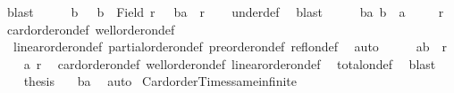 \begin{isabellebody}
\ blast\isanewline
\ \ \isamarkupfalse%
\ \isamarkupfalse%
\ b\ \ {}{\isacharcolon}{\kern0pt}\ {\isachardoublequoteopen}b\ {\isasymin}\ Field\ r\ {\isasymand}\ {\isasymnot}\ {\isacharparenleft}{\kern0pt}b{\isacharcomma}{\kern0pt}a{\isacharparenright}{\kern0pt}\ {\isasymin}\ r{\isachardoublequoteclose}\isanewline
\ \ \isamarkupfalse%
\ under{\isacharunderscore}{\kern0pt}def\ \isamarkupfalse%
\ blast\isanewline
\ \ \isamarkupfalse%
\ \isamarkupfalse%
\ ba{\isacharcolon}{\kern0pt}\ {\isachardoublequoteopen}b\ {\isasymnoteq}\ a{\isachardoublequoteclose}\isanewline
\ \ \isamarkupfalse%
\ {}\ r\ \isamarkupfalse%
\ card{\isacharunderscore}{\kern0pt}order{\isacharunderscore}{\kern0pt}on{\isacharunderscore}{\kern0pt}def\ well{\isacharunderscore}{\kern0pt}order{\isacharunderscore}{\kern0pt}on{\isacharunderscore}{\kern0pt}def\isanewline
\ \ linear{\isacharunderscore}{\kern0pt}order{\isacharunderscore}{\kern0pt}on{\isacharunderscore}{\kern0pt}def\ partial{\isacharunderscore}{\kern0pt}order{\isacharunderscore}{\kern0pt}on{\isacharunderscore}{\kern0pt}def\ preorder{\isacharunderscore}{\kern0pt}on{\isacharunderscore}{\kern0pt}def\ refl{\isacharunderscore}{\kern0pt}on{\isacharunderscore}{\kern0pt}def\ \isamarkupfalse%
\ auto\isanewline
\ \ \isamarkupfalse%
\ \isamarkupfalse%
\ {\isachardoublequoteopen}{\isacharparenleft}{\kern0pt}a{\isacharcomma}{\kern0pt}b{\isacharparenright}{\kern0pt}\ {\isasymin}\ r{\isachardoublequoteclose}\isanewline
\ \ \isamarkupfalse%
\ a\ r\ \isamarkupfalse%
\ card{\isacharunderscore}{\kern0pt}order{\isacharunderscore}{\kern0pt}on{\isacharunderscore}{\kern0pt}def\ well{\isacharunderscore}{\kern0pt}order{\isacharunderscore}{\kern0pt}on{\isacharunderscore}{\kern0pt}def\ linear{\isacharunderscore}{\kern0pt}order{\isacharunderscore}{\kern0pt}on{\isacharunderscore}{\kern0pt}def\isanewline
\ \ total{\isacharunderscore}{\kern0pt}on{\isacharunderscore}{\kern0pt}def\ \isamarkupfalse%
\ blast\isanewline
\ \ \isamarkupfalse%
\ {\isacharquery}{\kern0pt}thesis\ \isamarkupfalse%
\ {}\ ba\ \isamarkupfalse%
\ auto\isanewline
{}\isamarkupfalse%
%
\endisatagproof
{\isafoldproof}%
%
\isadelimproof
\isanewline
%
\endisadelimproof
\isanewline
{}\isamarkupfalse%
\ Card{\isacharunderscore}{\kern0pt}order{\isacharunderscore}{\kern0pt}Times{\isacharunderscore}{\kern0pt}same{\isacharunderscore}{\kern0pt}infinite{\isacharcolon}{\kern0pt}\isanewline

\end{isabellebody}
